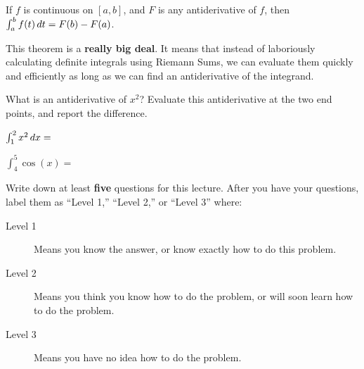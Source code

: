 \documentclass{ximera}
\begin{document}
\begin{theorem}
	If $f$ is continuous on $[a,b]$, and $F$ is any antiderivative of $f$, then $\int_a^b f(t) \,d t = F(b) - F(a)$.
\end{theorem}

This theorem is a \textbf{really big deal}.  It means that instead of laboriously calculating definite integrals using Riemann Sums, we can evaluate them quickly and efficiently as long as we can find an antiderivative of the integrand.

\begin{question}
	\begin{hint}
		What is an antiderivative of $x^2$?  Evaluate this antiderivative at the two end points, and report the difference.
	\end{hint}
	 $\int_1^2 x^2 \,d x =$
\end{question}

\begin{question}
	$\int_4^5 \cos(x)=$
\end{question}



Write down at least \textbf{five} questions for this lecture. After
you have your questions, label them as ``Level 1,'' ``Level 2,'' or ``Level 3'' where:
\begin{description}
\item[Level 1] Means you know the answer, or know exactly how to do this problem.
\item[Level 2] Means you think you know how to do the problem, or will soon learn how to do the problem.
\item[Level 3] Means you have no idea how to do the problem. 
\end{description}
\begin{question}
  \begin{freeResponse}
  \end{freeResponse}
\end{question}
\end{document}
